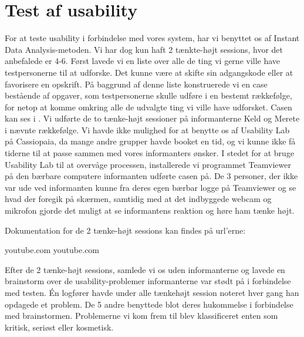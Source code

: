 \section{Test af usability}
\label{sec:usability}

For at teste usability i forbindelse med vores system, har vi benyttet os af Instant Data Analysis-metoden\cite{debida}. Vi har dog kun haft 2 tænkte-højt sessions, hvor det anbefalede er 4-6. Først lavede vi en liste over alle de ting vi gerne ville have testpersonerne til at udforske. Det kunne \fx være at skifte sin adgangskode eller at favorisere en opskrift. På baggrund af denne liste konstruerede vi en case bestående af opgaver, som testpersonerne skulle udføre i en bestemt rækkefølge, for netop at komme omkring alle de udvalgte ting vi ville have udforsket. Casen kan ses i . Vi udførte de to tænke-højt sessioner på informanterne Keld og Merete i nævnte rækkefølge. Vi havde ikke mulighed for at benytte os af Usability Lab på Cassiopaia, da mange andre grupper havde booket en tid, og vi kunne ikke få tiderne til at passe sammen med vores informanters ønsker. I stedet for at bruge Usability Lab til at overvåge processen, installerede vi programmet Teamviewer på den bærbare computere informanten udførte casen på. De 3 personer, der ikke var ude ved informanten kunne fra deres egen bærbar logge på Teamviewer og se hvad der foregik på skærmen, samtidig med at det indbyggede webcam og mikrofon gjorde det muligt at se informantens reaktion og høre ham tænke højt.

Dokumentation for de 2 tænke-højt sessions kan findes på url'erne:
\begin{itemize}[noitemsep]
youtube.com
youtube.com
\end{itemize}

Efter de 2 tænke-højt sessions, samlede vi os uden informanterne og lavede en brainstorm over de usability-problemer informanterne var stødt på i forbindelse med testen. Én logfører havde under alle tænkehøjt session noteret hver gang han opdagede et problem. De 5 andre benyttede blot deres hukommelse i forbindelse med brainstormen. Problemerne vi kom frem til blev klassificeret enten som kritisk, seriøst eller kosmetisk.

